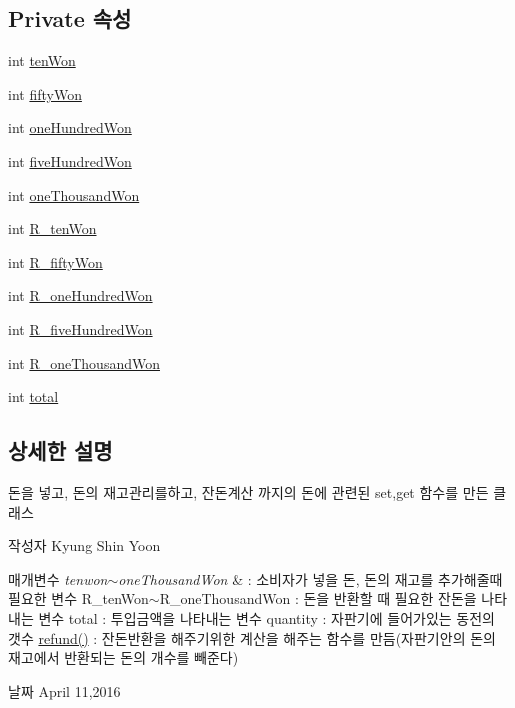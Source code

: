 \subsection*{Private 속성}
\begin{DoxyCompactItemize}
\item 
int \hyperlink{class_vending_machine_1_1_change_a0c9fe365f26d478fc07e1bb9828cfcc7}{ten\+Won}
\item 
int \hyperlink{class_vending_machine_1_1_change_a7559b56180084c477b10aebae956e13f}{fifty\+Won}
\item 
int \hyperlink{class_vending_machine_1_1_change_a82f462b3cad2218fb4c8ca15f4915374}{one\+Hundred\+Won}
\item 
int \hyperlink{class_vending_machine_1_1_change_a83d616c8b0b5c5b560edaeb06d2e3dc0}{five\+Hundred\+Won}
\item 
int \hyperlink{class_vending_machine_1_1_change_a949998e6d45fdaa880ebfa7ae2e06240}{one\+Thousand\+Won}
\item 
int \hyperlink{class_vending_machine_1_1_change_ade66d07bd5a80d7ea0dfc34704714243}{R\+\_\+ten\+Won}
\item 
int \hyperlink{class_vending_machine_1_1_change_a4e21e933b5ee7b25ebb7318af485de4e}{R\+\_\+fifty\+Won}
\item 
int \hyperlink{class_vending_machine_1_1_change_a03ee38bdf926f63d3d537d54b6dd6c85}{R\+\_\+one\+Hundred\+Won}
\item 
int \hyperlink{class_vending_machine_1_1_change_a37aebab952ad10a6c3a97d525eb20012}{R\+\_\+five\+Hundred\+Won}
\item 
int \hyperlink{class_vending_machine_1_1_change_aedcf39060a7c95aa27cce2d74853a16a}{R\+\_\+one\+Thousand\+Won}
\item 
int \hyperlink{class_vending_machine_1_1_change_aaa54155607801f52da0a520ef638e51d}{total}
\end{DoxyCompactItemize}


\subsection{상세한 설명}
돈을 넣고, 돈의 재고관리를하고, 잔돈계산 까지의 돈에 관련된 set,get 함수를 만든 클래스 

\begin{DoxyAuthor}{작성자}
Kyung Shin Yoon 
\end{DoxyAuthor}

\begin{DoxyParams}{매개변수}
{\em tenwon$\sim$one\+Thousand\+Won} & \+: 소비자가 넣을 돈, 돈의 재고를 추가해줄때 필요한 변수 R\+\_\+ten\+Won$\sim$\+R\+\_\+one\+Thousand\+Won \+: 돈을 반환할 때 필요한 잔돈을 나타내는 변수 total \+: 투입금액을 나타내는 변수 quantity \+: 자판기에 들어가있는 동전의 갯수 \hyperlink{class_vending_machine_1_1_change_a8a18aaee61e801a42585bcab94aa57cf}{refund()} \+: 잔돈반환을 해주기위한 계산을 해주는 함수를 만듬(자판기안의 돈의 재고에서 반환되는 돈의 개수를 빼준다) \\
\hline
\end{DoxyParams}
\begin{DoxyDate}{날짜}
April 11,2016 
\end{DoxyDate}


